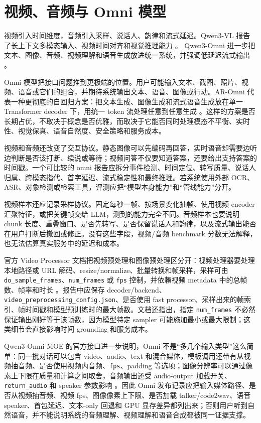 \documentclass[UTF8,zihao=-4,openany]{ctexbook}
\begin{document}
\section{视频、音频与 Omni 模型}
视频引入时间维度，音频引入采样、说话人、韵律和流式延迟。Qwen3-VL 报告了长上下文多模态输入、视频时间对齐和视觉推理能力 \cite{qwen2025qwen3vl}。 Qwen3-Omni 进一步把文本、图像、音频、视频理解和语音生成放进统一系统，并强调低延迟流式输出 \cite{qwen2025qwen3omni}。

Omni 模型把接口问题推到更极端的位置。用户可能输入文本、截图、照片、视频、语音或它们的组合，并期待系统输出文本、语音、图像或行动。AR-Omni 代表一种更彻底的自回归方案：把文本生成、图像生成和流式语音生成放在单一 Transformer decoder 下，用统一 token 流处理任意到任意生成 \cite{cheng2026aromni}。这样的方案是否长期占优，不取决于概念是否优雅，而取决于它能否同时处理模态不平衡、实时性、视觉保真、语音自然度、安全策略和服务成本。

视频和音频还改变了交互协议。静态图像可以先编码再回答，实时语音却需要边听边判断是否该打断、续说或等待；视频问答不仅要知道答案，还要给出支持答案的时间戳。一个可比较的 omni 报告应拆分事件检测、时间定位、转写质量、说话人归属、跨模态指代、首字延迟、流式稳定性和最终推理。若系统使用外部 OCR、ASR、对象检测或检索工具，评测应把“模型本身能力”和“管线能力”分开。

视频样本还应记录采样协议。固定每秒一帧、按场景变化抽帧、使用视频 encoder 汇聚特征，或把关键帧交给 LLM，测到的能力完全不同。音频样本也要说明 chunk 长度、重叠窗口、是否先转写、是否保留说话人和韵律，以及流式输出能否在用户打断后撤回或修正。没有这些字段，视频/音频 benchmark 分数无法解释，也无法估算真实服务中的延迟和成本。

官方 Video Processor 文档把视频预处理和图像预处理区分开：视频处理器要处理本地路径或 URL 解码、resize/normalize、批量转换和帧采样，采样可由 \texttt{do\_sample\_frames}、\texttt{num\_frames} 或 \texttt{fps} 控制，并依赖视频 metadata 中的总帧数、帧率和时长 \cite{huggingface2026transformersvideoprocessor}。报告中应保存 decoder/backend、\texttt{video\_preprocessing\_config.json}、是否使用 fast processor、采样出来的帧索引、帧时间戳和模型预训练时的最大帧数。文档还指出，指定 \texttt{num\_frames} 不必然保证输出刚好等于该帧数，因为模型特定 sampler 可能施加最小或最大限制；这类细节会直接影响时间 grounding 和服务成本。

Qwen3-Omni-MOE 的官方接口进一步说明，Omni 不是“多几个输入类型”这么简单：同一批对话可以包含 video、audio、text 和混合媒体，模板调用还带有从视频抽音频、是否使用视频内音频、\texttt{fps}、padding 等选项；图像分辨率可以通过像素上下限在质量和计算之间取舍，音频输出还受 audio-output 加载开关、\texttt{return\_audio} 和 speaker 参数影响 \cite{huggingface2026transformersqwen3omni}。因此 Omni 发布记录应把输入媒体路径、是否从视频抽音频、视频 fps、图像像素上下限、是否加载 talker/code2wav、语音 speaker、首包延迟、文本-only 回退和 GPU 显存差异都列出来；否则用户听到自然语音，并不能说明系统的音频理解、视频理解和语音合成都被同一证据支撑。
\end{document}
